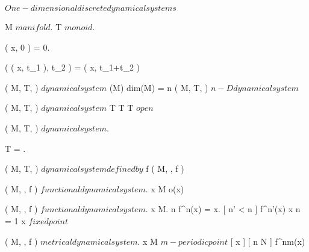 \documentclass[../Main/main]{subfiles}
\begin{document}
\unit{ $ One-dimensional discrete dynamical systems $ }
{	
	
	
	{
		{
			M $ manifold $.
			T $ monoid $.

		}
		{
			{
				\phi( x, 0 ) = 0.

				{
					\phi( \phi( x, t_1 ), t_2 ) = \phi( x, t_1+t_2 )
				}
			}
		}

	}
	{
		{
			( M, T, \phi ) $ dynamical system $
		}
		{
			\dim(M)
		}
		\denote
		{
			dim(M) = n \as ( M, T, \phi ) $ n-D dynamical system $
		}
	}


	{
		{
			( M, T, \phi ) $ dynamical system $
		}
		{
			T \countable
		}
		{
			T \subset \R \suchthat T $ open $
		}
	}


	{
		{
			( M, T, \phi ) $ dynamical system $.
		}
		{
			T = \N.

		}
		\denote
		{
			( M, T, \phi ) $ dynamical system defined by $ f \as ( M, \N, f )
		}
	}
	
	
	{
		{
			( M, \N, f ) $ functional dynamical system $.
			x \in M
		}
		{
		}
		\denote
		{
			o(x)
		}
	}
	
	
	{
		{
			( M, \N, f ) $ functional dynamical system $.
			x \in M.
			n \in \N
		}
		{
			f^n(x) = x.
			[ n' < n ]
			{
				f^{n'}(x) \neq x
			}
		}
		\denote
		{
			n = 1 \as x $ fixed point $
		}
	}
	

	{
		{
			( M, \N, f ) $ metrical dynamical system $.
			x \in M $ m-periodic point $
		}
		{
		}
		{
			[ x \in \Uc ]
			{
				{
					{
						[ n \geq N ]
						{
							f^{nm}(x) \nin \Uc
						}
					}
				}
			}
		}
	}
	
}
\end{document}
